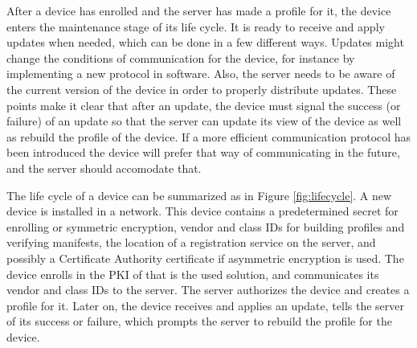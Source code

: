 \documentclass[0-thesis.tex]{subfiles}
\begin{document}
After a device has enrolled and the server has made a profile for it, the device enters
the maintenance stage of its life cycle. It is ready to receive and apply updates when
needed, which can be done in a few different ways. Updates might change the conditions of
communication for the device, for instance by implementing a new protocol in software.
Also, the server needs to be aware of the current version of the device in order to
properly distribute updates. These points make it clear that after an update, the device
must signal the success (or failure) of an update so that the server can update its view
of the device as well as rebuild the profile of the device. If a more efficient
communication protocol has been introduced the device will prefer that way of
communicating in the future, and the server should accomodate that.

The life cycle of a device can be summarized as in Figure \ref{fig:lifecycle}. A new
device is installed in a network. This device contains a predetermined secret for
enrolling or symmetric encryption, vendor and class IDs for building profiles and
verifying manifests, the location of a registration service on the server, and possibly a
Certificate Authority certificate if asymmetric encryption is used. The device enrolls in
the PKI of that is the used solution, and communicates its vendor and class IDs to the
server. The server authorizes the device and creates a profile for it. Later on, the
device receives and applies an update, tells the server of its success or failure, which
prompts the server to rebuild the profile for the device.
\end{document}
